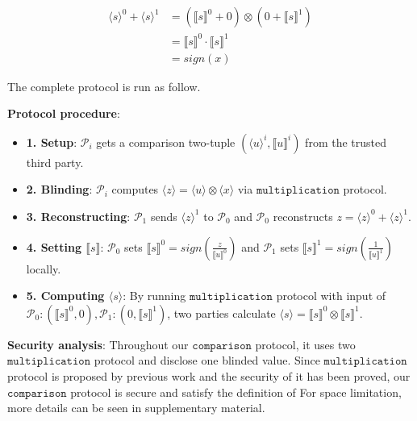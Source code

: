 \documentclass[letterpaper]{article} %
\begin{document}
    \begin{align*}
        \langle s\rangle^{0} +\langle s\rangle^{1}&=(\llbracket s \rrbracket ^{0}+0)\otimes (0+\llbracket s \rrbracket ^{1})\\
        &=\llbracket s \rrbracket ^{0}\cdot \llbracket s \rrbracket ^{1}\\
        &=sign(x)
    \end{align*}

    

    
       The complete protocol is run as follow. 
    
       \textbf{Protocol procedure}:
       \begin{itemize}
           \item \textbf{1. Setup}: $\mathcal{P}_{i}$ gets a comparison two-tuple $(\langle u\rangle ^{i},\llbracket u \rrbracket ^{i})$ from the trusted third party.
           
           \item \textbf{2. Blinding}: 
           $\mathcal{P}_{i}$ computes $\langle z\rangle = \langle u\rangle \otimes \langle x\rangle $ via $\mathtt{multiplication}$ protocol.


           \item \textbf{3. Reconstructing}:
           $\mathcal{P}_{1}$ sends $\langle z\rangle ^{1}$ to $\mathcal{P}_{0}$ and 
           $\mathcal{P}_{0}$ reconstructs
           $z = \langle z\rangle ^{0}+\langle z\rangle ^{1}$.


        
           \item \textbf{4. Setting $\llbracket s \rrbracket$}: 
           $\mathcal{P}_{0}$ sets $\llbracket s \rrbracket^{0}
           =sign(\frac{z}{\llbracket u \rrbracket^{0}})$
           and $\mathcal{P}_{1}$ sets $\llbracket s \rrbracket^{1}
           =sign(\frac{1}{\llbracket u \rrbracket^{1}})$ locally.
       
           \item \textbf{5. Computing $\langle s\rangle$}: 
           By running $\mathtt{multiplication}$ protocol with input of 
           $\mathcal{P}_{0}:(\llbracket s \rrbracket ^{0},0),\mathcal{P}_{1}:(0,\llbracket s \rrbracket ^{1})$, 
           two parties calculate  $\langle s\rangle = \llbracket s \rrbracket ^{0}\otimes \llbracket s \rrbracket ^{1}$.

       \end{itemize}
       \textbf{Security analysis}:
       Throughout our $\mathtt{comparison}$ protocol,
       it uses two $\mathtt{multiplication}$ protocol and disclose one blinded value.
       Since $\mathtt{multiplication}$ protocol is proposed by previous work 
       and the security of it has been proved, our $\mathtt{comparison}$ protocol is secure
       and satisfy the definition of  
       For space limitation, more details can be seen in supplementary material.
    
\end{document}
